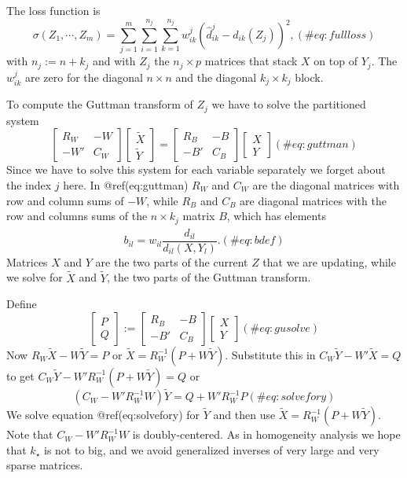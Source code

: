 \documentclass[
  12pt,
  letterpaper,
  DIV=11,
  numbers=noendperiod]{scrartcl}
\begin{document}
The loss function is \begin{equation}
\sigma(Z_1,\cdots,Z_m)=\sum_{j=1}^m\sum_{i=1}^{n_j}\sum_{k=1}^{n_j}w_{ik}^j(\hat d_{ik}^j-d_{ik}(Z_j))^2,
(\#eq:fullloss)
\end{equation} with \(n_j:=n+k_j\) and with \(Z_j\) the \(n_j\times p\)
matrices that stack \(X\) on top of \(Y_j\). The \(w_{ik}^j\) are zero
for the diagonal \(n\times n\) and the diagonal \(k_j\times k_j\) block.

To compute the Guttman transform of \(Z_j\) we have to solve the
partitioned system \begin{equation}
\begin{bmatrix}
R_W&-W\\
-W'&C_W
\end{bmatrix}
\begin{bmatrix}\tilde X\\\tilde Y\end{bmatrix}=
\begin{bmatrix}
R_B&-B\\
-B'&C_B
\end{bmatrix}
\begin{bmatrix}X\\Y\end{bmatrix}
(\#eq:guttman)
\end{equation} Since we have to solve this system for each variable
separately we forget about the index \(j\) here. In @ref(eq:guttman)
\(R_W\) and \(C_W\) are the diagonal matrices with row and column sums
of \(-W\), while \(R_B\) and \(C_B\) are diagonal matrices with the row
and columns sums of the \(n\times k_j\) matrix \(B\), which has elements
\begin{equation}
b_{il}=w_{il}\frac{\hat d_{il}}{d_{il}(X,Y_l)}.
(\#eq:bdef)
\end{equation} Matrices \(X\) and \(Y\) are the two parts of the current
\(Z\) that we are updating, while we solve for \(\tilde X\) and
\(\tilde Y\), the two parts of the Guttman transform.

Define \begin{equation}
\begin{bmatrix}
P\\Q
\end{bmatrix}:=
\begin{bmatrix}
R_B&-B\\
-B'&C_B
\end{bmatrix}
\begin{bmatrix}X\\Y\end{bmatrix}
(\#eq:gusolve)
\end{equation} Now \(R_W\tilde X-W\tilde Y=P\) or
\(\tilde X=R_W^{-1}(P+W\tilde Y)\). Substitute this in
\(C_W\tilde Y-W'\tilde X=Q\) to get
\(C_W\tilde Y-W'R_W^{-1}(P+W\tilde Y)=Q\) or \begin{equation}
(C_W-W'R_W^{-1}W)\tilde Y=Q+W'R_W^{-1}P
(\#eq:solvefory)
\end{equation} We solve equation @ref(eq:solvefory) for \(\tilde Y\) and
then use \(\tilde X=R_W^{-1}(P+W\tilde Y)\). Note that
\(C_W-W'R_W^{-1}W\) is doubly-centered. As in homogeneity analysis we
hope that \(k_\star\) is not to big, and we avoid generalized inverses
of very large and very sparse matrices.
\end{document}
